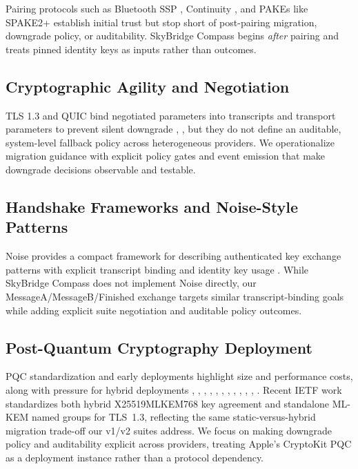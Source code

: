 \documentclass[10pt,journal,compsoc]{IEEEtran}
\begin{document}
Pairing protocols such as Bluetooth SSP \cite{ref2}, Continuity \cite{ref3},
and PAKEs like SPAKE2+ \cite{ref4} establish initial trust but stop short
of post-pairing migration, downgrade policy, or auditability. SkyBridge
Compass begins \emph{after} pairing and treats pinned identity keys as
inputs rather than outcomes.

\subsection{Cryptographic Agility and
Negotiation}\label{b.-cryptographic-agility-and-negotiation}

TLS 1.3 and QUIC bind negotiated parameters into transcripts and
transport parameters to prevent silent downgrade \cite{ref6}, \cite{ref18},
but they do not define an auditable, system-level fallback policy across
heterogeneous providers. We operationalize migration guidance
\cite{ref7,ref38} with explicit policy gates and event emission that make
downgrade decisions observable and testable.

\subsection{Handshake Frameworks and Noise-Style
Patterns}\label{c.-handshake-frameworks-and-noise-style-patterns}

Noise provides a compact framework for describing authenticated key
exchange patterns with explicit transcript binding and identity key
usage \cite{ref19}. While SkyBridge Compass does not implement Noise
directly, our MessageA/MessageB/Finished exchange targets similar
transcript-binding goals while adding explicit suite negotiation and
auditable policy outcomes.

\subsection{Post-Quantum Cryptography
Deployment}\label{d.-post-quantum-cryptography-deployment}

PQC standardization and early deployments highlight size and performance
costs, along with pressure for hybrid deployments \cite{ref8}, \cite{ref9},
\cite{ref10}, \cite{ref15}, \cite{ref40}, \cite{ref22}, \cite{ref41},
\cite{ref42}, \cite{ref17}, \cite{ref23}, \cite{ref24}, \cite{ref25}.
Recent IETF work standardizes both hybrid X25519MLKEM768 key agreement
\cite{ref44} and standalone ML-KEM named groups \cite{ref45} for
TLS~1.3, reflecting the same static-versus-hybrid migration trade-off our
v1/v2 suites address. We
focus on making downgrade policy and auditability explicit across
providers, treating Apple's CryptoKit PQC \cite{ref1,ref34} as a deployment
instance rather than a protocol dependency.
\end{document}
